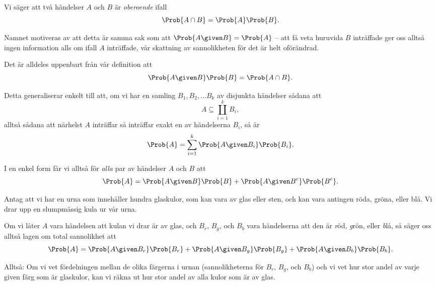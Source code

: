 \documentclass[nobib]{tufte-handout}
\begin{document}
\begin{definition}
    Vi säger att två händelser $A$ och $B$ är \emph{oberoende} ifall
    $$\Prob{A \cap B} = \Prob{A}\Prob{B}.$$

    Namnet motiveras av att detta är samma sak som att $\Prob{A \given B} = \Prob{A}$ -- att få veta huruvida $B$ inträffade ger oss alltså ingen information alls om ifall $A$ inträffade, vår skattning av sannolikheten för det är helt oförändrad.
\end{definition}

\begin{lemma}\label{law_of_total_probability}
    Det är alldeles uppenbart från vår definition att
    $$\Prob{A \given B}\Prob{B} = \Prob{A \cap B}.$$

    Detta generaliserar enkelt till att, om vi har en samling $B_1, B_2, \ldots B_k$ av disjunkta händelser sådana att
    $$A \subseteq \coprod_{i=1}^k B_i,$$
    alltså sådana att närhelst $A$ inträffar så inträffar exakt en av händelserna $B_i$, så är
    $$\Prob{A} = \sum_{i=1}^{k} \Prob{A \given B_i}\Prob{B_i}.$$

    I en enkel form får vi alltså för \emph{alla} par av händelser $A$ och $B$ att
    $$\Prob{A} = \Prob{A \given B}\Prob{B} + \Prob{A \given B^c}\Prob{B^c}.$$
\end{lemma}

\begin{example}
    Antag att vi har en urna som innehåller hundra glaskulor, som kan vara av glas eller sten, och kan vara antingen röda, gröna, eller blå. Vi drar upp en slumpmässig kula ur vår urna.

    Om vi låter $A$ vara händelsen att kulan vi drar är av glas, och $B_r$, $B_g$, och $B_b$ vara händelserna att den är \emph{r}öd, \emph{g}rön, eller \emph{b}lå, så säger oss alltså lagen om total sannolikhet att
    $$\Prob{A} = \Prob{A \given B_r}\Prob{B_r} + \Prob{A \given B_g}\Prob{B_g} + \Prob{A \given B_b}\Prob{B_b}.$$

    Alltså: Om vi vet fördelningen mellan de olika färgerna i urnan (sannolikheterna för $B_r$, $B_g$, och $B_b$) och vi vet hur stor andel av varje given färg som är glaskulor, kan vi räkna ut hur stor andel av alla kulor som är av glas.
\end{example}
\end{document}
